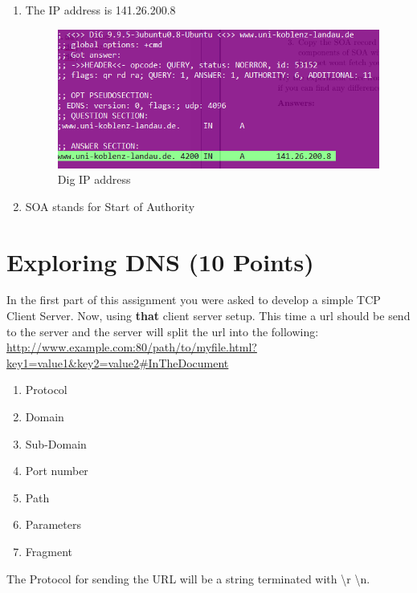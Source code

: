 \documentclass{WeSTassignment}
\begin{document}
\begin{enumerate}
\item The IP address is 141.26.200.8 \\
\begin{figure}[h]
  \centering
  \includegraphics{dig.png}
   \caption{Dig IP address}
     \label{fig:dig} 
\end{figure}
\item SOA stands for Start of Authority 
\end{enumerate}


\section{Exploring DNS (10 Points)}

In the first part of this assignment you were asked to develop a simple TCP Client Server. Now, using \textbf{that} client server setup.
This time a url should be send to the server and the server will split the url into the following:\\ 

\url{http://www.example.com:80/path/to/myfile.html?key1=value1&key2=value2#InTheDocument}

\begin{enumerate}
\item Protocol
\item Domain
\item Sub-Domain
\item Port number
\item Path
\item Parameters
\item Fragment
\end{enumerate}

The Protocol for sending the URL will be a string terminated with \backslash r \backslash n.
\end{document}
